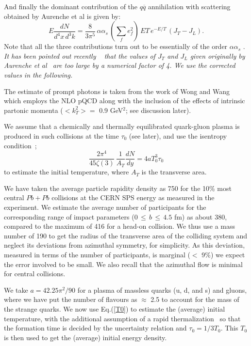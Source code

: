  And finally the dominant contribution of the $q\overline{q}$ annihilation
with scattering obtained by Aurenche et al is given by:
\begin{equation}
E\frac{dN}{d^4x\,d^3k}=\frac{8}{3\pi^5}\,\alpha\alpha_s\,
                          \left(\sum_f e_f^2\right)\, ET \,
                          e^{-E/T}\,(J_T-J_L).
\end{equation}
Note that all the three contributions turn out to be  essentially of the order
$\alpha \alpha_s$ \cite{pat}. {\em It has been pointed out recently
~\cite{MT} that the
values of $J_T$ and $J_L$ given originally by Aurenche et al~\cite{pat}
 are too large by a numerical factor of 4. We use the corrected values in the
following.}
 
The estimate of prompt photons is taken from the work of Wong and 
Wang~\cite{wong} which employs the NLO pQCD along with the inclusion of the
effects of intrinsic partonic momenta ($ <k_T^2>=$ 0.9 GeV$^2$;
see discussion later).

We assume that a chemically and thermally equilibrated quark-gluon
plasma is produced in such collisions at the time $\tau_0$ (see
later), and use the isentropy condition~\cite{bj};
\begin{equation}
\frac{2\pi^4}{45\zeta(3)}\,\frac{1}{A_T}\frac{dN}{dy}=4 a
T_0^3\tau_0
\label{T0}
\end{equation}
to estimate the initial temperature, where $A_T$ is the
transverse area. 

We have
taken the  average particle rapidity density as 750 for the 10\% most
 central $Pb+Pb$ collisions at the CERN SPS energy
as measured in the experiment.  We estimate the average number of
participants for the corresponding range of impact parameters
($0\, \leq\, b \, \leq \, 4.5$ fm) as  about 380, compared to the maximum of
416 for  a head-on collision. We thus use a mass number of 190 to get the
 radius of the
transverse area of the colliding system and neglect
its deviations from azimuthal symmetry, for simplicity.
As this deviation, measured in terms of the number of participants, is
marginal ($<$ 9\%) we expect the error involved to be small. We also
recall that the azimuthal flow is minimal for central collisions.

 We take $a=42.25\pi^2/90$ for
a plasma of massless quarks (u, d, and s) and gluons, where we have 
put the number of flavours as
$\approx$ 2.5 to account for the mass of the strange quarks.
We now use Eq.(\ref{T0}) to estimate the (average) initial temperature, 
with the  
additional assumption of a rapid thermalization~\cite{kms} so that
the formation time is decided by the uncertainty relation and $\tau_0=1/3T_0$.
This $T_0$ is then used to get the (average) initial energy density.

